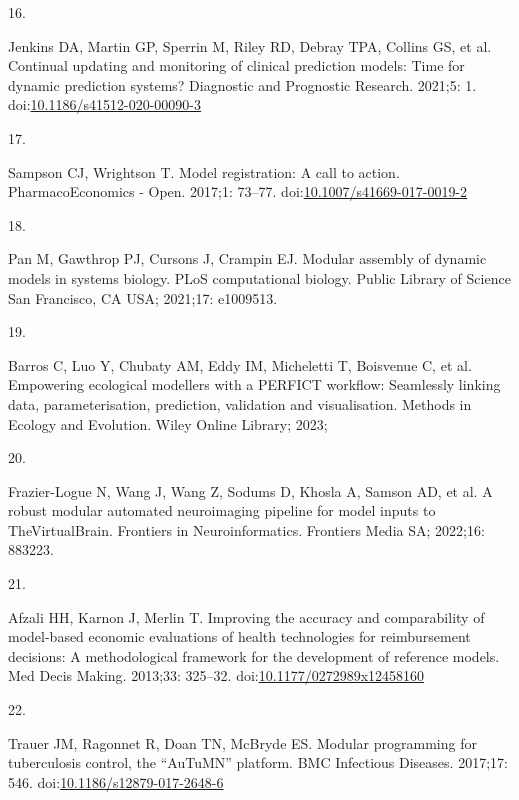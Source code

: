 \documentclass[
]{article}
\newlength{\cslhangindent}
\newlength{\csllabelwidth}
\newlength{\cslentryspacingunit} %
\newenvironment{CSLReferences}[2] %
 {%
  \setlength{\parindent}{0pt}
  \ifodd #1
  \let\oldpar\par
  \def\par{\hangindent=\cslhangindent\oldpar}
  \fi
  \setlength{\parskip}{#2\cslentryspacingunit}
 }%
 {}
\newcommand{\CSLLeftMargin}[1]{\parbox[t]{\csllabelwidth}{#1}}
\newcommand{\CSLRightInline}[1]{\parbox[t]{\linewidth - \csllabelwidth}{#1}\break}
\begin{document}
\begin{CSLReferences}{0}{0}
\leavevmode{}%
\CSLLeftMargin{16. }%
\CSLRightInline{Jenkins DA, Martin GP, Sperrin M, Riley RD, Debray TPA, Collins GS, et al. Continual updating and monitoring of clinical prediction models: Time for dynamic prediction systems? Diagnostic and Prognostic Research. 2021;5: 1. doi:\href{https://doi.org/10.1186/s41512-020-00090-3}{10.1186/s41512-020-00090-3}}

\leavevmode{}%
\CSLLeftMargin{17. }%
\CSLRightInline{Sampson CJ, Wrightson T. Model registration: A call to action. PharmacoEconomics - Open. 2017;1: 73--77. doi:\href{https://doi.org/10.1007/s41669-017-0019-2}{10.1007/s41669-017-0019-2}}

\leavevmode{}%
\CSLLeftMargin{18. }%
\CSLRightInline{Pan M, Gawthrop PJ, Cursons J, Crampin EJ. Modular assembly of dynamic models in systems biology. PLoS computational biology. Public Library of Science San Francisco, CA USA; 2021;17: e1009513. }

\leavevmode{}%
\CSLLeftMargin{19. }%
\CSLRightInline{Barros C, Luo Y, Chubaty AM, Eddy IM, Micheletti T, Boisvenue C, et al. Empowering ecological modellers with a PERFICT workflow: Seamlessly linking data, parameterisation, prediction, validation and visualisation. Methods in Ecology and Evolution. Wiley Online Library; 2023; }

\leavevmode{}%
\CSLLeftMargin{20. }%
\CSLRightInline{Frazier-Logue N, Wang J, Wang Z, Sodums D, Khosla A, Samson AD, et al. A robust modular automated neuroimaging pipeline for model inputs to TheVirtualBrain. Frontiers in Neuroinformatics. Frontiers Media SA; 2022;16: 883223. }

\leavevmode{}%
\CSLLeftMargin{21. }%
\CSLRightInline{Afzali HH, Karnon J, Merlin T. Improving the accuracy and comparability of model-based economic evaluations of health technologies for reimbursement decisions: A methodological framework for the development of reference models. Med Decis Making. 2013;33: 325--32. doi:\href{https://doi.org/10.1177/0272989x12458160}{10.1177/0272989x12458160}}

\leavevmode{}%
\CSLLeftMargin{22. }%
\CSLRightInline{Trauer JM, Ragonnet R, Doan TN, McBryde ES. Modular programming for tuberculosis control, the {``AuTuMN''} platform. BMC Infectious Diseases. 2017;17: 546. doi:\href{https://doi.org/10.1186/s12879-017-2648-6}{10.1186/s12879-017-2648-6}}


\end{CSLReferences}
\end{document}
